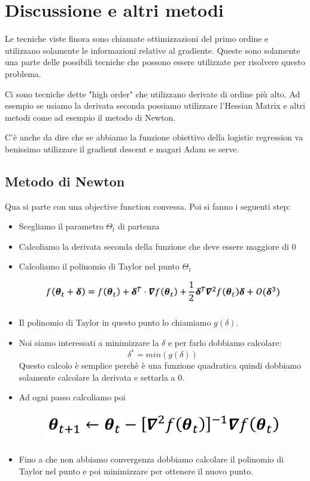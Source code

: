 \documentclass[14pt]{extreport}
\begin{document}
\section{Discussione e altri metodi}

Le tecniche viste finora sono chiamate ottimizzazioni del primo ordine e utilizzano solamente le informazioni relative al gradiente. Queste sono
solamente una parte delle possibili tecniche che possono essere utilizzate per risolvere questo problema.

Ci sono tecniche dette "high order" che utilizzano derivate di ordine più alto. Ad esempio se usiamo la derivata seconda possiamo utilizzare l'Hessian
Matrix e altri metodi come ad esempio il metodo di Newton.

C'è anche da dire che se abbiamo la funzione obiettivo della logistic regression va benissimo utilizzare il gradient descent e magari Adam se serve.

\subsection{Metodo di Newton}

Qua si parte con una objective function convessa. Poi si fanno i seguenti step:

\begin{itemize}
	\item Scegliamo il parametro $\Theta_t$ di partenza
	\item Calcoliamo la derivata seconda della funzione che deve essere maggiore di 0
	\item Calcoliamo il polinomio di Taylor nel punto $\Theta_t$ \begin{figure}[H]
		      \centering
		      \includegraphics[width=0.7\linewidth]{256.jpeg}
	      \end{figure}
	\item Il polinomio di Taylor in questo punto lo chiamiamo $g(\delta)$.
	\item Noi siamo interessati a minimizzare la $\delta$ e per farlo dobbiamo calcolare: $$\delta^* = min(g(\delta))$$ Questo calcolo è semplice
	      perchè è una funzione quadratica quindi dobbiamo solamente calcolare la derivata e settarla a 0.
	\item Ad ogni passo calcoliamo poi \begin{figure}[H]
		      \centering
		      \includegraphics[width=0.7\linewidth]{257.jpeg}
	      \end{figure}
	\item Fino a che non abbiamo convergenza dobbiamo calcolare il polinomio di Taylor nel punto e poi minimizzare per ottenere il nuovo punto.
\end{itemize}
\end{document}
